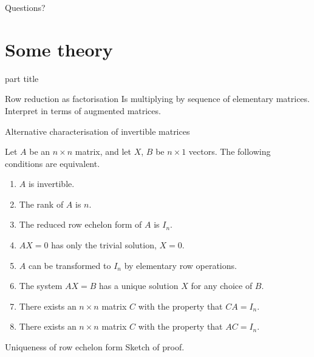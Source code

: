 \documentclass{beamer}
\begin{document}
\begin{frame}
  Questions?
\end{frame}

\section{Some theory}

\begin{frame}
  \begin{beamercolorbox}[sep=12pt,center]{part title}
    \insertsection\par
  \end{beamercolorbox}
\end{frame}

\begin{frame}{Row reduction as factorisation}
  Is multiplying by sequence of elementary matrices.
  Interpret in terms of augmented matrices.
\end{frame}

\begin{frame}{Alternative characterisation of invertible matrices}
  \begin{theorem}
    Let $A$ be an $n\times n$ matrix, and
    let $X$, $B$ be $n \times 1$ vectors.
    The following conditions are equivalent.
    \begin{enumerate}
    \item $A$ is invertible.
    \item The rank of $A$ is $n$. 
    \item The reduced row echelon form of $A$ is $I_n$.
    \item $AX=0$ has only the trivial solution, $X=0$.
    \item $A$ can be transformed to $I_n$ by elementary row operations.
    \item
      The system $AX=B$ has a unique solution $X$ for any
      choice of $B$.
    \item
      There exists an $n\times n$ matrix $C$ with the property that $CA=I_n$.
    \item
      There exists an $n\times n$ matrix $C$ with the property that $AC=I_n$.
    \end{enumerate}
  \end{theorem}
\end{frame}

\begin{frame}{Uniqueness of row echelon form}
  Sketch of proof.
\end{frame}
\end{document}
